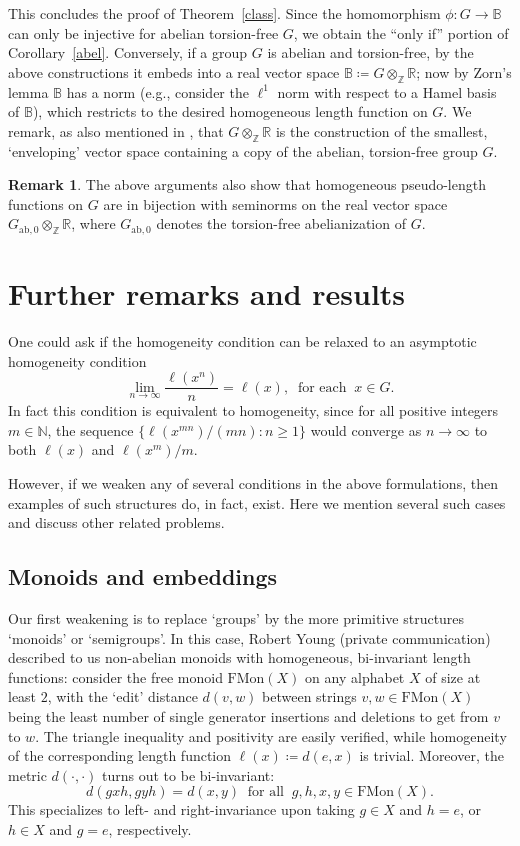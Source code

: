 \documentclass[11pt,a4paper,reqno]{amsart}
\numberwithin{equation}{section}
\theoremstyle{plain}
\theoremstyle{definition}
\newtheorem{remark}[equation]{Remark}
\newcommand\R{\mathbb{R}}
\newcommand\Z{\mathbb{Z}}
\newcommand\N{\mathbb{N}}
\newcommand\norm[1]{\ell({#1})}   %
\begin{document}
This concludes the proof of Theorem~\ref{class}.  Since the homomorphism
$\phi: G \to \mathbb{B}$ can only be injective for abelian torsion-free
$G$, we obtain the ``only if'' portion of Corollary~\ref{abel}.
Conversely, if a group $G$ is abelian and torsion-free, by the above
constructions it embeds into a real vector space $\mathbb{B} \coloneqq G
\otimes_\Z \R$; now by Zorn's lemma $\mathbb{B}$ has a norm (e.g.,
consider the $\ell^1$ norm with respect to a Hamel basis of
$\mathbb{B}$), which restricts to the desired homogeneous length function
on $G$. We remark, as also mentioned in \cite{KR2}, that $G \otimes_\Z
\R$ is the construction of the smallest, `enveloping' vector space
containing a copy of the abelian, torsion-free group $G$.

\begin{remark}
The above arguments also show that homogeneous pseudo-length functions on
$G$ are in bijection with seminorms on the real vector space
$G_{\mathrm{ab},0} \otimes_\Z \R$, where $G_{\mathrm{ab},0}$ denotes the
torsion-free abelianization of $G$.
\end{remark}


\section{Further remarks and results}\label{remarks-sec}

One could ask if the homogeneity condition can be relaxed to an
asymptotic homogeneity condition
\[
\lim_{n \to \infty} \frac{\norm{ x^n }}{ n } = \norm{ x }, \ \text{ for
each }\ x \in G.
\]
In fact this condition is equivalent to homogeneity,
since for all positive integers $m \in \N$, the sequence
$\{ \norm{ x^{mn} } / (mn) : n \geq 1 \}$ would converge
as $n \to \infty$ to both $\norm{ x }$ and $\norm{ x^m } / m$.

However, if we weaken any of several conditions in the above
formulations, then examples of such structures do, in fact, exist. Here
we mention several such cases and discuss other related problems.


\subsection{Monoids and embeddings}

Our first weakening is to replace `groups' by the more primitive
structures `monoids' or `semigroups'. In this case, Robert Young (private
communication) described to us non-abelian monoids with homogeneous,
bi-invariant length functions:
consider the free monoid $\mathrm{FMon}(X)$ on any alphabet $X$ of size
at least $2$, with the `edit' distance $d(v,w)$ between strings $v,w \in
\mathrm{FMon}(X)$ being the least number of single generator insertions
and deletions to get from $v$ to $w$. The triangle inequality and
positivity are easily verified, while homogeneity of the corresponding
length function $\norm{x} \coloneqq d(e,x)$ is trivial. Moreover, the
metric $d(\cdot,\cdot)$ turns out to be bi-invariant:
\[
d(gxh,gyh) = d(x,y) \ \text{ for all }\ g,h,x,y \in \mathrm{FMon}(X).
\]
This specializes to left- and right-invariance upon taking $g \in X$ and
$h = e$, or  $h \in X$ and $g = e$, respectively.
\end{document}
